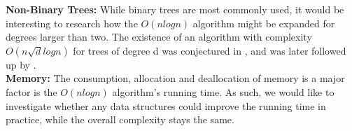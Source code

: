 \noindent\textbf{Non-Binary Trees:} While binary trees are most commonly used, it would be interesting to research how the $O(nlogn)$ algorithm might be expanded for degrees larger than two. The existence of an algorithm with complexity $O(n\sqrt{d}logn)$ for trees of degree d was conjectured in \cite{nlogn}, and was later followed up by \cite{FastMatch}. \\

\noindent\textbf{Memory:} The consumption, allocation and deallocation of memory is a major factor is the $O(nlogn)$ algorithm's running time. As such, we would like to investigate whether any data structures could improve the running time in practice, while the overall complexity stays the same. 
